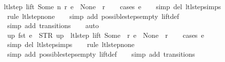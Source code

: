 \begin{isabellebody}
ltl{\isacharunderscore}step\ lift\ {\isacharparenleft}Some\ n{\isacharparenright}\ r\ e\ {\isacharequal}\ {\isacharparenleft}None{\isacharcomma}\ {\isacharbrackleft}{\isacharbrackright}{\isacharcomma}\ r{\isacharparenright}{\isachardoublequoteclose}\isanewline
%
\isadelimproof
\ \ %
\endisadelimproof
%
\isatagproof
{}\isamarkupfalse%
\ {\isacharparenleft}cases\ e{\isacharparenright}\isanewline
\ \ \isamarkupfalse%
\ {\isacharparenleft}simp\ del{\isacharcolon}\ ltl{\isacharunderscore}step{\isachardot}simps{\isacharparenright}\isanewline
\ \ \isamarkupfalse%
\ {\isacharparenleft}rule\ ltl{\isacharunderscore}step{\isacharunderscore}none{\isacharparenright}\isanewline
\ \ \isamarkupfalse%
\ {\isacharparenleft}simp\ add{\isacharcolon}\ possible{\isacharunderscore}steps{\isacharunderscore}empty\ lift{\isacharunderscore}def{\isacharparenright}\isanewline
\ \ \isamarkupfalse%
\ {\isacharparenleft}simp\ add{\isacharcolon}\ transitions{\isacharparenright}\isanewline
\ \ \isamarkupfalse%
\ auto%
\endisatagproof
{\isafoldproof}%
%
\isadelimproof
\isanewline
%
\endisadelimproof
\isanewline
{}\isamarkupfalse%
\ up{\isacharunderscore}{}{\isacharcolon}\ {\isachardoublequoteopen}fst\ e\ {\isacharequal}\ STR\ {\isacharprime}{\isacharprime}up{\isacharprime}{\isacharprime}\ {\isasymLongrightarrow}\ ltl{\isacharunderscore}step\ lift\ {\isacharparenleft}Some\ {}{\isacharparenright}\ r\ e\ {\isacharequal}\ {\isacharparenleft}None{\isacharcomma}\ {\isacharbrackleft}{\isacharbrackright}{\isacharcomma}\ r{\isacharparenright}{\isachardoublequoteclose}\isanewline
%
\isadelimproof
\ \ %
\endisadelimproof
%
\isatagproof
{}\isamarkupfalse%
\ {\isacharparenleft}cases\ e{\isacharparenright}\isanewline
\ \ \isamarkupfalse%
\ {\isacharparenleft}simp\ del{\isacharcolon}\ ltl{\isacharunderscore}step{\isachardot}simps{\isacharparenright}\isanewline
\ \ \isamarkupfalse%
\ {\isacharparenleft}rule\ ltl{\isacharunderscore}step{\isacharunderscore}none{\isacharparenright}\isanewline
\ \ \isamarkupfalse%
\ {\isacharparenleft}simp\ add{\isacharcolon}\ possible{\isacharunderscore}steps{\isacharunderscore}empty\ lift{\isacharunderscore}def{\isacharparenright}\isanewline
\ \ \isamarkupfalse%
\ {\isacharparenleft}simp\ add{\isacharcolon}\ transitions{\isacharparenright}%
\endisatagproof
{\isafoldproof}%
%
\isadelimproof
\isanewline
%
\endisadelimproof
\isanewline
{}\isamarkupfalse%

\end{isabellebody}
